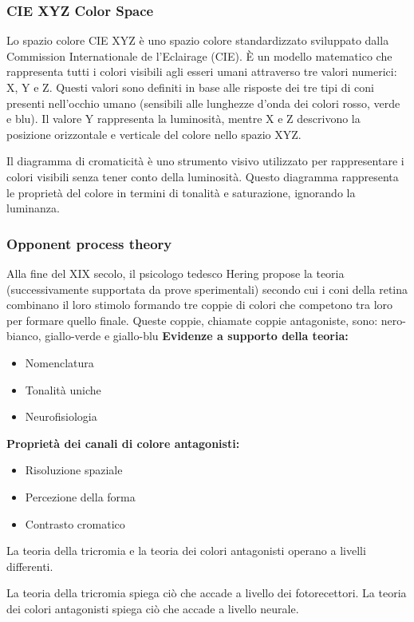 \subsubsection{CIE XYZ Color Space}

Lo spazio colore CIE XYZ è uno spazio colore standardizzato sviluppato dalla Commission Internationale de l'Eclairage (CIE). È un modello matematico che rappresenta tutti i colori visibili agli esseri umani attraverso tre valori numerici: X, Y e Z.
Questi valori sono definiti in base alle risposte dei tre tipi di coni presenti nell'occhio umano (sensibili alle lunghezze d'onda dei colori rosso, verde e blu).
Il valore Y rappresenta la luminosità, mentre X e Z descrivono la posizione orizzontale e verticale del colore nello spazio XYZ.
 
Il diagramma di cromaticità è uno strumento visivo utilizzato per rappresentare i colori visibili senza tener conto della luminosità. Questo diagramma rappresenta le proprietà del colore in termini di tonalità e saturazione, ignorando la luminanza.
\subsubsection{Opponent process theory}

Alla fine del XIX secolo, il psicologo tedesco Hering propose la teoria (successivamente supportata da prove sperimentali) secondo cui i coni della retina combinano il loro stimolo formando tre coppie di colori che competono tra loro per formare quello finale. Queste coppie, chiamate coppie antagoniste, sono: nero-bianco, giallo-verde e giallo-blu
\textbf{Evidenze a supporto della teoria:}
\begin{itemize}
  \item Nomenclatura
  \item Tonalità uniche
  \item Neurofisiologia
\end{itemize}

\textbf{Proprietà dei canali di colore antagonisti:}
\begin{itemize}
  \item Risoluzione spaziale
  \item Percezione della forma
  \item Contrasto cromatico
\end{itemize}

La teoria della tricromia e la teoria dei colori antagonisti operano a livelli differenti.

La teoria della tricromia spiega ciò che accade a livello dei fotorecettori.
La teoria dei colori antagonisti spiega ciò che accade a livello neurale.
